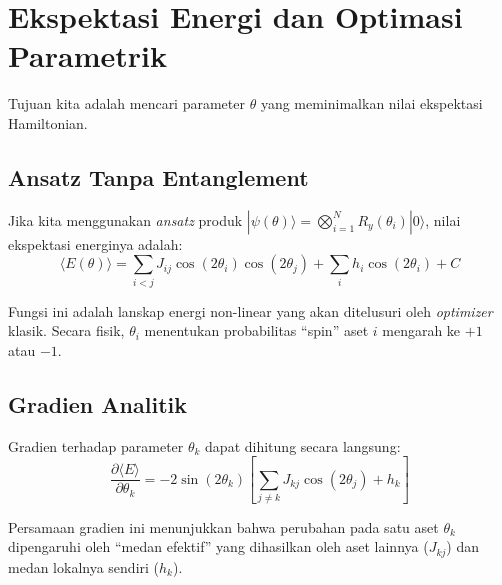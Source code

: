 \hypertarget{ekspektasi-energi-dan-optimasi-parametrik}{%
\section{Ekspektasi Energi dan Optimasi Parametrik}\label{ekspektasi-energi-dan-optimasi-parametrik}}

Tujuan kita adalah mencari parameter \(\theta\) yang meminimalkan nilai ekspektasi Hamiltonian.

\hypertarget{a.-ansatz-tanpa-entanglement}{%
\subsection{Ansatz Tanpa Entanglement}\label{a.-ansatz-tanpa-entanglement}}

Jika kita menggunakan \emph{ansatz} produk \(|\psi(\theta)\rangle = \bigotimes_{i=1}^N R_y(\theta_i)|0\rangle\), nilai ekspektasi energinya adalah: \[ \langle E(\theta) \rangle = \sum_{i<j} J_{ij} \cos(2\theta_i)\cos(2\theta_j) + \sum_i h_i \cos(2\theta_i) + C \]

Fungsi ini adalah lanskap energi non-linear yang akan ditelusuri oleh \emph{optimizer} klasik. Secara fisik, \(\theta_i\) menentukan probabilitas ``spin'' aset \(i\) mengarah ke \(+1\) atau \(-1\).

\hypertarget{b.-gradien-analitik}{%
\subsection{Gradien Analitik}\label{b.-gradien-analitik}}

Gradien terhadap parameter \(\theta_k\) dapat dihitung secara langsung: \[ \frac{\partial \langle E \rangle}{\partial \theta_k} = -2\sin(2\theta_k) \left[ \sum_{j \neq k} J_{kj} \cos(2\theta_j) + h_k \right] \]

Persamaan gradien ini menunjukkan bahwa perubahan pada satu aset \(\theta_k\) dipengaruhi oleh ``medan efektif'' yang dihasilkan oleh aset lainnya (\(J_{kj}\)) dan medan lokalnya sendiri (\(h_k\)).


